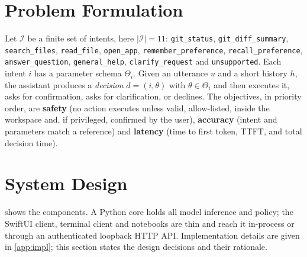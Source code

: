 \documentclass[10pt,twocolumn,letterpaper]{article}
\theoremstyle{definition}
\begin{document}
\section{Problem Formulation}\label{sec:problem}

Let $\mathcal{I}$ be a finite set of intents, here $|\mathcal{I}|=11$: \texttt{git\_status},
\texttt{git\_diff\_summary}, \texttt{search\_files}, \texttt{read\_file}, \texttt{open\_app},
\texttt{remember\_preference}, \texttt{recall\_preference}, \texttt{answer\_question},
\texttt{general\_help}, \texttt{clarify\_request} and \texttt{unsupported}. Each intent $i$ has a
parameter schema $\Theta_i$. Given an utterance $u$ and a short history $h$, the assistant produces a
\emph{decision} $d=(i,\theta)$ with $\theta\in\Theta_i$ and then executes it, asks for
confirmation, asks for clarification, or declines. The objectives, in priority order, are
\textbf{safety} (no action executes unless valid, allow-listed, inside the workspace and, if
privileged, confirmed by the user), \textbf{accuracy} (intent and parameters match a reference) and
\textbf{latency} (time to first token, TTFT, and total decision time).

\section{System Design}\label{sec:design}

 shows the components. A Python core holds all model inference and policy; the
SwiftUI client, terminal client and notebooks are thin and reach it in-process or through an
authenticated loopback HTTP API. Implementation details are given in \cref{app:impl}; this section
states the design decisions and their rationale.
\end{document}
